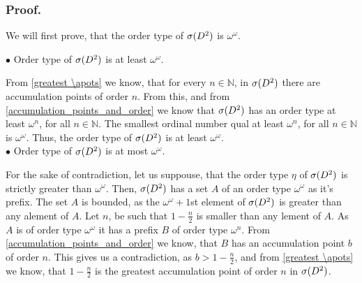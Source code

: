 \subsubsection{Proof.} 

We will first prove, that the order type of ${{\sigma}(D^2)}$ is $\omega^\omega$.

$\bullet$ Order type of ${{\sigma}(D^2)}$ is at least $\omega^\omega$.

From \ref{greatest \apots} we know, that for every $n\in \mathbb{N}$, in ${{\sigma}(D^2)}$ there are 
accumulation points of order $n$. From this, and from \ref{accumulation_points_and_order} 
we know that ${{\sigma}(D^2)}$ has an order type at least $\omega^n$, for all $n\in \mathbb{N}$. 
The smallest ordinal number qual at least $\omega^n$, for all $n \in \mathbb{N}$ is 
$\omega^\omega$. Thus, the order type of ${{\sigma}(D^2)}$ is at least $\omega^\omega$.\\

$\bullet$ Order type of ${{\sigma}(D^2)}$ is at most $\omega^\omega$.

For the sake of contradiction, let us suppouse, that the order type $\eta$ of ${{\sigma}(D^2)}$ is 
strictly greater than $\omega^\omega$. Then, ${{\sigma}(D^2)}$ has a set $A$ of an order type 
$\omega^\omega$ as it's prefix. The set $A$ is bounded, as the $\omega^\omega+1$st element of 
${{\sigma}(D^2)}$ is greater than any alement of $A$. 
Let $n$, be such that $1-\frac{n}{2}$ is smaller than any lement of $A$. 
As $A$ is of order type $\omega^\omega$ it has a prefix $B$ of order type $\omega^n$.
From \ref{accumulation_points_and_order} we know, that $B$ has an accumulation point $b$ 
of order $n$. This gives us a contradiction, as $b > 1-\frac{n}{2}$, and from \ref{greatest \apots} 
we know, that $1-\frac{n}{2}$ is the greatest accumulation point of order $n$ in ${{\sigma}(D^2)}$. \\

%
%

